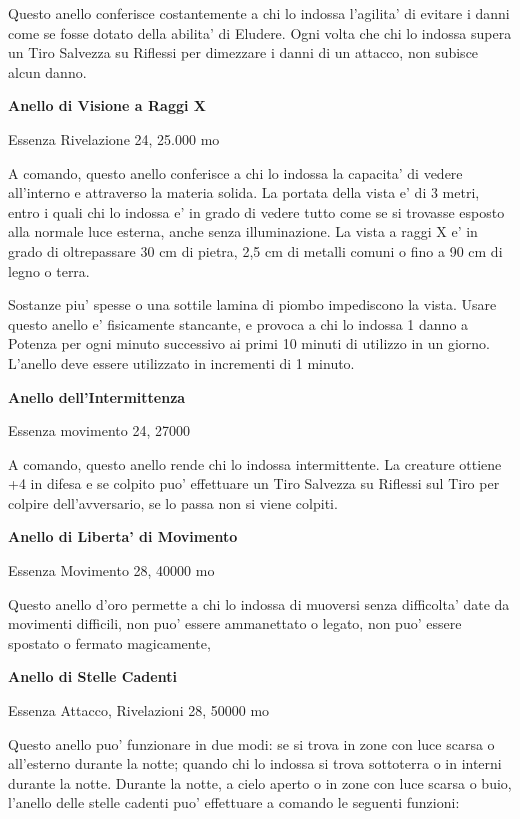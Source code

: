 \documentclass[a4paper,11pt,twoside,openany]{book}
\begin{document}
{		Questo anello conferisce costantemente a chi lo indossa l'agilita' di evitare i danni come se fosse dotato della abilita' di Eludere. Ogni volta che chi lo indossa supera un Tiro Salvezza su Riflessi per dimezzare i danni di un attacco, non subisce alcun danno. 
		
		\textbf{Anello di Visione a Raggi X}
		
		Essenza Rivelazione 24, 25.000 mo
		
		A comando, questo anello conferisce a chi lo indossa la capacita' di vedere all'interno e attraverso la materia solida. La portata della vista e' di 3 metri, entro i quali chi lo indossa e' in grado di vedere tutto come se si trovasse esposto alla normale luce esterna, anche senza illuminazione. La vista a raggi X e' in grado di oltrepassare 30 cm di pietra, 2,5 cm di metalli comuni o fino a 90 cm di legno o terra.
		
		Sostanze piu' spesse o una sottile lamina di piombo impediscono la vista. Usare questo anello e' fisicamente stancante, e provoca a chi lo indossa 1 danno a Potenza per ogni minuto successivo ai primi 10 minuti di utilizzo in un giorno. L'anello deve essere utilizzato in incrementi di 1 minuto.
		
		\textbf{Anello dell'Intermittenza}
		
		Essenza movimento 24, 27000
		
		A comando, questo anello rende chi lo indossa intermittente. La creature ottiene +4 in difesa e se colpito puo' effettuare un Tiro Salvezza su Riflessi sul Tiro per colpire dell'avversario, se lo passa non si viene colpiti.
		
		\textbf{Anello di Liberta' di Movimento}
		
		Essenza Movimento 28, 40000 mo
		
		Questo anello d'oro permette a chi lo indossa di muoversi senza difficolta' date da movimenti difficili, non puo' essere ammanettato o legato, non puo' essere spostato o fermato magicamente,
		
		\textbf{Anello di Stelle Cadenti}
		
		Essenza Attacco, Rivelazioni 28, 50000 mo
		
		Questo anello puo' funzionare in due modi: se si trova in zone con luce scarsa o all'esterno durante la notte; quando chi lo indossa si trova sottoterra o in interni durante la notte. Durante la notte, a cielo aperto o in zone con luce scarsa o buio, l'anello delle stelle cadenti puo' effettuare a comando le seguenti funzioni:
		
}
\end{document}
